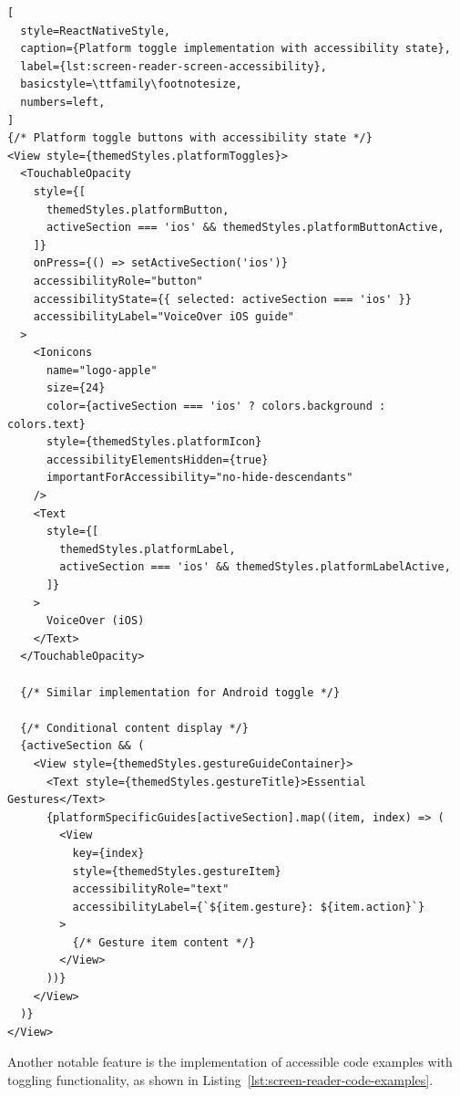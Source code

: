\begin{lstlisting}[
  style=ReactNativeStyle,
  caption={Platform toggle implementation with accessibility state},
  label={lst:screen-reader-screen-accessibility},
  basicstyle=\ttfamily\footnotesize,
  numbers=left,
]
{/* Platform toggle buttons with accessibility state */}
<View style={themedStyles.platformToggles}>
  <TouchableOpacity
    style={[
      themedStyles.platformButton,
      activeSection === 'ios' && themedStyles.platformButtonActive,
    ]}
    onPress={() => setActiveSection('ios')}
    accessibilityRole="button"
    accessibilityState={{ selected: activeSection === 'ios' }}
    accessibilityLabel="VoiceOver iOS guide"
  >
    <Ionicons
      name="logo-apple"
      size={24}
      color={activeSection === 'ios' ? colors.background : colors.text}
      style={themedStyles.platformIcon}
      accessibilityElementsHidden={true}
      importantForAccessibility="no-hide-descendants"
    />
    <Text
      style={[
        themedStyles.platformLabel,
        activeSection === 'ios' && themedStyles.platformLabelActive,
      ]}
    >
      VoiceOver (iOS)
    </Text>
  </TouchableOpacity>
  
  {/* Similar implementation for Android toggle */}
  
  {/* Conditional content display */}
  {activeSection && (
    <View style={themedStyles.gestureGuideContainer}>
      <Text style={themedStyles.gestureTitle}>Essential Gestures</Text>
      {platformSpecificGuides[activeSection].map((item, index) => (
        <View
          key={index}
          style={themedStyles.gestureItem}
          accessibilityRole="text"
          accessibilityLabel={`${item.gesture}: ${item.action}`}
        >
          {/* Gesture item content */}
        </View>
      ))}
    </View>
  )}
</View>
\end{lstlisting}
\FloatBarrier

Another notable feature is the implementation of accessible code examples with toggling functionality, as shown in Listing~\ref{lst:screen-reader-code-examples}.

